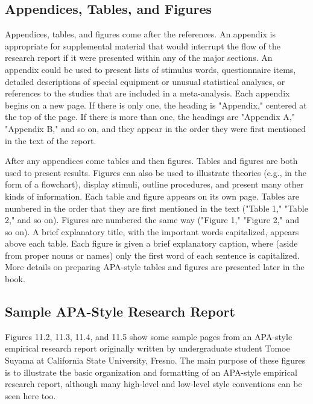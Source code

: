 \subsection{Appendices, Tables, and Figures}

Appendices, tables, and figures come after the references. An appendix is appropriate for supplemental material that would interrupt the flow of the research report if it were presented within any of the major sections. An appendix could be used to present lists of stimulus words, questionnaire items, detailed descriptions of special equipment or unusual statistical analyses, or references to the studies that are included in a meta-analysis. Each appendix begins on a new page. If there is only one, the heading is "Appendix," centered at the top of the page. If there is more than one, the headings are "Appendix A," "Appendix B," and so on, and they appear in the order they were first mentioned in the text of the report.

After any appendices come tables and then figures. Tables and figures are both used to present results. Figures can also be used to illustrate theories (e.g., in the form of a flowchart), display stimuli, outline procedures, and present many other kinds of information. Each table and figure appears on its own page. Tables are numbered in the order that they are first mentioned in the text ("Table 1," "Table 2," and so on). Figures are numbered the same way ("Figure 1," "Figure 2," and so on). A brief explanatory title, with the important words capitalized, appears above each table. Each figure is given a brief explanatory caption, where (aside from proper nouns or names) only the first word of each sentence is capitalized. More details on preparing APA-style tables and figures are presented later in the book.

\subsection{Sample APA-Style Research Report}

Figures 11.2, 11.3, 11.4, and 11.5 show some sample pages from an APA-style empirical research report originally written by undergraduate student Tomoe Suyama at California State University, Fresno. The main purpose of these figures is to illustrate the basic organization and formatting of an APA-style empirical research report, although many high-level and low-level style conventions can be seen here too.

